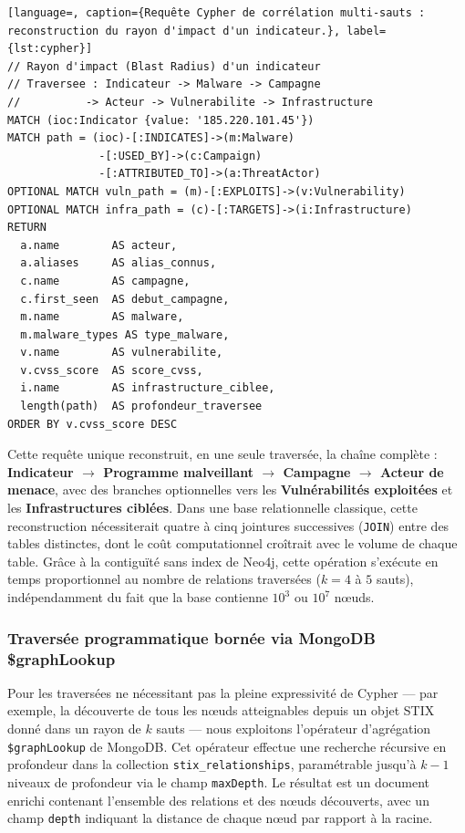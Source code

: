 \begin{lstlisting}[language=, caption={Requête Cypher de corrélation multi-sauts : reconstruction du rayon d'impact d'un indicateur.}, label={lst:cypher}]
// Rayon d'impact (Blast Radius) d'un indicateur
// Traversee : Indicateur -> Malware -> Campagne
//          -> Acteur -> Vulnerabilite -> Infrastructure
MATCH (ioc:Indicator {value: '185.220.101.45'})
MATCH path = (ioc)-[:INDICATES]->(m:Malware)
              -[:USED_BY]->(c:Campaign)
              -[:ATTRIBUTED_TO]->(a:ThreatActor)
OPTIONAL MATCH vuln_path = (m)-[:EXPLOITS]->(v:Vulnerability)
OPTIONAL MATCH infra_path = (c)-[:TARGETS]->(i:Infrastructure)
RETURN
  a.name        AS acteur,
  a.aliases     AS alias_connus,
  c.name        AS campagne,
  c.first_seen  AS debut_campagne,
  m.name        AS malware,
  m.malware_types AS type_malware,
  v.name        AS vulnerabilite,
  v.cvss_score  AS score_cvss,
  i.name        AS infrastructure_ciblee,
  length(path)  AS profondeur_traversee
ORDER BY v.cvss_score DESC
\end{lstlisting}

Cette requête unique reconstruit, en une seule traversée, la chaîne complète : \textbf{Indicateur $\rightarrow$ Programme malveillant $\rightarrow$ Campagne $\rightarrow$ Acteur de menace}, avec des branches optionnelles vers les \textbf{Vulnérabilités exploitées} et les \textbf{Infrastructures ciblées}. Dans une base relationnelle classique, cette reconstruction nécessiterait quatre à cinq jointures successives (\texttt{JOIN}) entre des tables distinctes, dont le coût computationnel croîtrait avec le volume de chaque table. Grâce à la contiguïté sans index de Neo4j, cette opération s'exécute en temps proportionnel au nombre de relations traversées ($k = 4$ à $5$ sauts), indépendamment du fait que la base contienne $10^3$ ou $10^7$ n\oe uds.

\subsubsection{Traversée programmatique bornée via MongoDB \$graphLookup}

Pour les traversées ne nécessitant pas la pleine expressivité de Cypher --- par exemple, la découverte de tous les n\oe uds atteignables depuis un objet STIX donné dans un rayon de $k$ sauts --- nous exploitons l'opérateur d'agrégation \texttt{\$graphLookup} de MongoDB. Cet opérateur effectue une recherche récursive en profondeur dans la collection \texttt{stix\_relationships}, paramétrable jusqu'à $k-1$ niveaux de profondeur via le champ \texttt{maxDepth}. Le résultat est un document enrichi contenant l'ensemble des relations et des n\oe uds découverts, avec un champ \texttt{depth} indiquant la distance de chaque n\oe ud par rapport à la racine.

